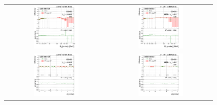 \begin{figure}[bh]
  \begin{center}
    \begin{tabular}{cc}
      \includegraphics[width=0.45\textwidth]{figures/Zprime/2017/ScaleFactor/SameSign/N-1/g_compare_cut_Et_Barrel_ea_ta_inc_AS_N_1_HoE_PUW.png} &
      \includegraphics[width=0.45\textwidth]{figures/Zprime/2017/ScaleFactor/SameSign/N-1/g_compare_cut_Et_Endcap_ea_ta_inc_AS_N_1_HoE_PUW.png} \\
      \includegraphics[width=0.45\textwidth]{figures/Zprime/2017/ScaleFactor/SameSign/N-1/g_compare_cut_phi_Barrel_ea_ta_inc_AS_N_1_HoE_PUW.png} &
      \includegraphics[width=0.45\textwidth]{figures/Zprime/2017/ScaleFactor/SameSign/N-1/g_compare_cut_phi_Endcap_ea_ta_inc_AS_N_1_HoE_PUW.png} \\

\end{tabular}
\end{center}
\end{figure}
